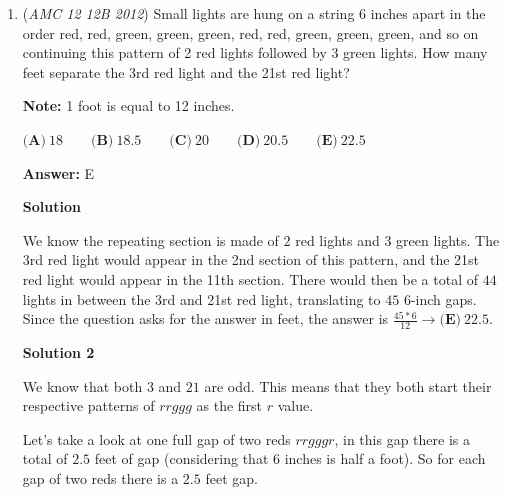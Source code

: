 \begin{enumerate}
\textbf{Solution}

The original expression $x-y$ now becomes $(x+k) - (y-k)=(x-y)+2k>x-y$, where $k$ is a positive constant, hence the answer is $\boxed{\textbf{(A)}}$.

 



\textbf{Solution 2}

The problem never says what $x$ and $y$ are, so we can decide what they are. Let $x = 1.6$ and $y = 1.4$. We round $x$ to $2$ and $y$ to $1$. Then the new $x - y = 1$, while the original $x - y = 0.2$. Thus, the new $x - y$ is greater than the original $x - y$. The answer is $\boxed{\textbf{(A)}}$. ~Extremelysupercooldude

 


	\item (\textit{AMC 12 12B 2012}) Small lights are hung on a string 6 inches apart in the order red, red, green, green, green, red, red, green, green, green, and so on continuing this pattern of 2 red lights followed by 3 green lights. How many feet separate the 3rd red light and the 21st red light?


 \textbf{Note:} 1 foot is equal to 12 inches.


 $\textbf{(A)}\ 18\qquad\textbf{(B)}\ 18.5\qquad\textbf{(C)}\ 20\qquad\textbf{(D)}\ 20.5\qquad\textbf{(E)}\ 22.5$

 \textbf{Answer: }E



\textbf{Solution}

We know the repeating section is made of $2$ red lights and $3$ green lights. The 3rd red light would appear in the 2nd section of this pattern, and the 21st red light would appear in the 11th section. There would then be a total of $44$ lights in between the 3rd and 21st red light, translating to $45$ $6$-inch gaps. Since the question asks for the answer in feet, the answer is $\frac{45*6}{12} \rightarrow \boxed{\textbf{(E)}\ 22.5}$.

 



\textbf{Solution 2}

We know that both $3$ and $21$ are odd. This means that they both start their respective patterns of $rrggg$ as the first $r$ value.

 Let's take a look at one full gap of two reds $rrgggr$, in this gap there is a total of $2.5$ feet of gap (considering that $6$ inches is half a foot). So for each gap of two reds there is a $2.5$ feet gap.


\end{enumerate}
